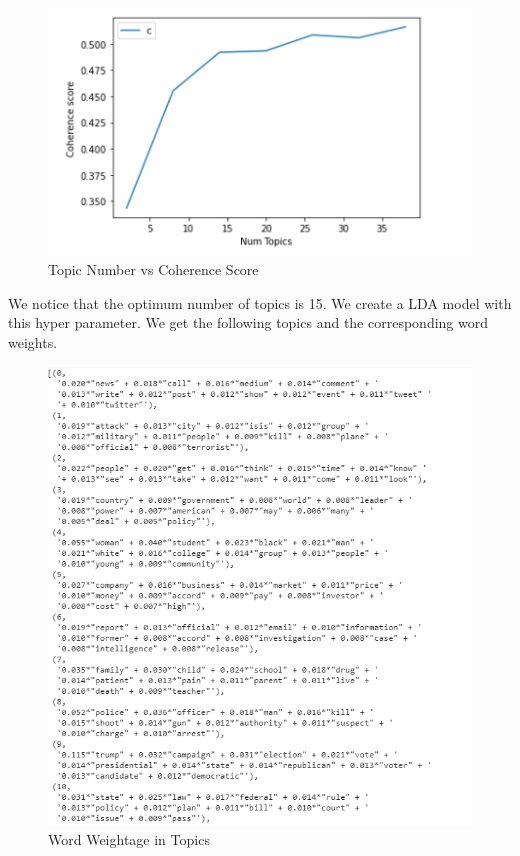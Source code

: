 \documentclass{article}
\begin{document}
\begin{figure}[H]
    \centering
    \includegraphics[scale=1.5]{score.PNG}
    \caption{Topic Number vs Coherence Score}
    \label{Topic Number vs Coherence Scorel}
\end{figure}

We notice that the optimum number of topics is 15. We create a LDA model with this hyper parameter. We get the following topics and the corresponding word weights.

\begin{figure}[H]
    \centering
    \includegraphics[scale=0.8]{NeuRIPS2019/words.PNG}
    \caption{Word Weightage in Topics}
    \label{Word Weightage in Topics}
\end{figure}
\end{document}
